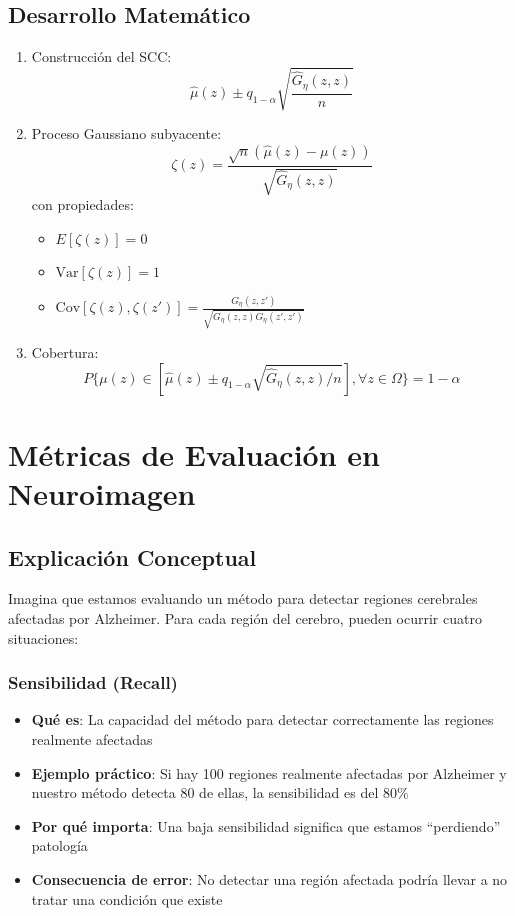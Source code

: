 \documentclass[12pt,a4paper]{article}
\begin{document}
\subsection{Desarrollo Matemático}
\begin{enumerate}
\item Construcción del SCC:
  \begin{equation}
  \hat{\mu}(z) \pm q_{1-\alpha}\sqrt{\frac{\hat{G}_\eta(z,z)}{n}}
  \end{equation}

\item Proceso Gaussiano subyacente:
  \begin{equation}
  \zeta(z) = \frac{\sqrt{n}(\hat{\mu}(z) - \mu(z))}{\sqrt{\hat{G}_\eta(z,z)}}
  \end{equation}
  con propiedades:
  \begin{itemize}
  \item $E[\zeta(z)] = 0$
  \item $\text{Var}[\zeta(z)] = 1$
  \item $\text{Cov}[\zeta(z),\zeta(z')] = \frac{G_\eta(z,z')}{\sqrt{G_\eta(z,z)G_\eta(z',z')}}$
  \end{itemize}

\item Cobertura:
  \begin{equation}
  P\{\mu(z) \in [\hat{\mu}(z) \pm q_{1-\alpha}\sqrt{\hat{G}_\eta(z,z)/n}], \forall z \in \Omega\} = 1-\alpha
  \end{equation}
\end{enumerate}

\section{Métricas de Evaluación en Neuroimagen}

\subsection{Explicación Conceptual}

Imagina que estamos evaluando un método para detectar regiones cerebrales afectadas por Alzheimer. Para cada región del cerebro, pueden ocurrir cuatro situaciones:

\subsubsection{Sensibilidad (Recall)}
\begin{itemize}
\item \textbf{Qué es}: La capacidad del método para detectar correctamente las regiones realmente afectadas
\item \textbf{Ejemplo práctico}: Si hay 100 regiones realmente afectadas por Alzheimer y nuestro método detecta 80 de ellas, la sensibilidad es del 80\%
\item \textbf{Por qué importa}: Una baja sensibilidad significa que estamos ``perdiendo'' patología
\item \textbf{Consecuencia de error}: No detectar una región afectada podría llevar a no tratar una condición que existe
\end{itemize}
\end{document}
